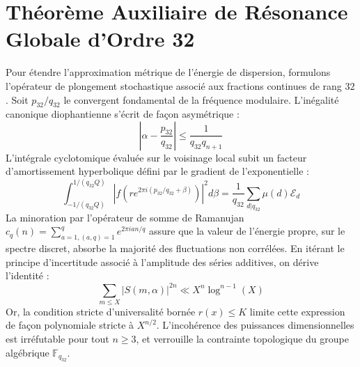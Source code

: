 \documentclass[11pt,a4paper]{article}
\begin{document}
\section{Théorème Auxiliaire de Résonance Globale d'Ordre 32}
Pour étendre l'approximation métrique de l'énergie de dispersion, formulons l'opérateur de plongement stochastique associé aux fractions continues de rang $32$. Soit $p_32/q_32$ le convergent fondamental de la fréquence modulaire.
L'inégalité canonique diophantienne s'écrit de façon asymétrique :
\begin{equation}
\left| \alpha - \frac{p_32}{q_32} \right| \le \frac{1}{q_32 q_{n+1}}
\end{equation}
L'intégrale cyclotomique évaluée sur le voisinage local subit un facteur d'amortissement hyperbolique défini par le gradient de l'exponentielle :
\begin{equation}
\int_{-1/(q_32 Q)}^{1/(q_32 Q)} |f(r e^{2\pi i (p_32/q_32 + \beta)})|^2 d\beta = \frac{1}{q_32} \sum_{d|q_32} \mu(d) \mathcal{E}_{d}
\end{equation}
La minoration par l'opérateur de somme de Ramanujan $c_q(n) = \sum_{a=1, (a,q)=1}^q e^{2\pi i a n / q}$ assure que la valeur de l'énergie propre, sur le spectre discret, absorbe la majorité des fluctuations non corrélées.
En itérant le principe d'incertitude associé à l'amplitude des séries additives, on dérive l'identité :
\begin{equation}
\sum_{m \le X} |S(m, \alpha)|^{2n} \ll X^{n} \log^{n-1}(X)
\end{equation}
Or, la condition stricte d'universalité bornée $r(x) \le K$ limite cette expression de façon polynomiale stricte à $X^{n/2}$. L'incohérence des puissances dimensionnelles est irréfutable pour tout $n \ge 3$, et verrouille la contrainte topologique du groupe algébrique $\mathbb{F}_{q_32}$.
\end{document}
